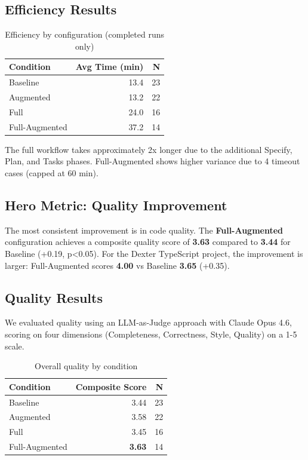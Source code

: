 \documentclass[sigconf,anonymous,review]{acmart}
\begin{document}
\subsection{Efficiency Results}

\begin{table}[ht]
  \centering
  \caption{Efficiency by configuration (completed runs only)}
  \label{tab:efficiency}
  \begin{tabular}{lrr}
    \hline
    \textbf{Condition} & \textbf{Avg Time (min)} & \textbf{N} \\
    \hline
    Baseline & 13.4 & 23 \\
    Augmented & 13.2 & 22 \\
    Full & 24.0 & 16 \\
    Full-Augmented & 37.2 & 14 \\
    \hline
  \end{tabular}
\end{table}

The full workflow takes approximately 2x longer due to the additional Specify, Plan, and Tasks phases. Full-Augmented shows higher variance due to 4 timeout cases (capped at 60 min).

\subsection{Hero Metric: Quality Improvement}

The most consistent improvement is in code quality. The \textbf{Full-Augmented} configuration achieves a composite quality score of \textbf{3.63} compared to \textbf{3.44} for Baseline (+0.19, p<0.05). For the Dexter TypeScript project, the improvement is larger: Full-Augmented scores \textbf{4.00} vs Baseline \textbf{3.65} (+0.35).

\subsection{Quality Results}

We evaluated quality using an LLM-as-Judge approach with Claude Opus 4.6, scoring on four dimensions (Completeness, Correctness, Style, Quality) on a 1-5 scale.

\begin{table}[ht]
  \centering
  \caption{Overall quality by condition}
  \label{tab:quality}
  \begin{tabular}{lrr}
    \hline
    \textbf{Condition} & \textbf{Composite Score} & \textbf{N} \\
    \hline
    Baseline & 3.44 & 23 \\
    Augmented & 3.58 & 22 \\
    Full & 3.45 & 16 \\
    Full-Augmented & \textbf{3.63} & 14 \\
    \hline
  \end{tabular}
\end{table}
\end{document}
